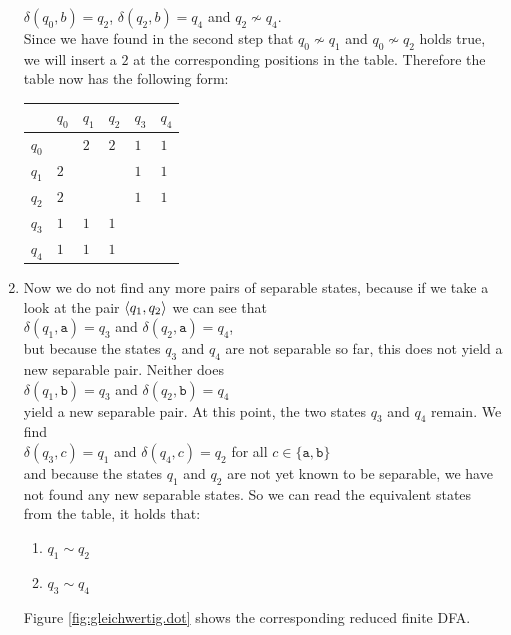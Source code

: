 \begin{enumerate}
      $\delta(q_0,b) = q_2$, \quad $\delta(q_2,b) = q_4$ \quad and \quad $q_2 \not\sim q_4$.
      \\[0.2cm]
      Since we have found in the second step that $q_0 \not\sim q_1$ and $q_0 \not\sim q_2$ holds true, we will insert a $2$ at the corresponding positions in the table. Therefore the table now has the following form:
      \begin{center}        
      \begin{tabular}[t]{|l||l|l|l|l|l|}
      \hline
        & $q_0$      &      $q_1$ &      $q_2$ &      $q_3$ &      $q_4$  \\
      \hline
      \hline
      $q_0$ &          &$2$ &$2$ &$1$ &$1$  \\
      \hline
      $q_1$ &$2$ &          &          &$1$ &$1$  \\
      \hline
      $q_2$ &$2$ &          &          &$1$ &$1$  \\
      \hline
      $q_3$ &$1$ &$1$ &$1$ &          &           \\
      \hline
      $q_4$ &$1$ &$1$ &$1$ &          &           \\
      \hline
      \end{tabular}
      \end{center}
\item Now we do not find any more pairs of separable states, because if we take a look at the pair $\pair(q_1,q_2)$ we can see that
      \\[0.2cm]
      \hspace*{1.3cm}
      $\delta(q_1,\texttt{a}) = q_3$ \quad and \quad $\delta(q_2,\texttt{a}) = q_4$, 
      \\[0.2cm]
      but because the states $q_3$ and $q_4$ are not separable so far, this does not yield a new
      separable pair.  Neither does 
      \\[0.2cm]
      \hspace*{1.3cm}
      $\delta(q_1,\texttt{b}) = q_3$ \quad and \quad $\delta(q_2,\texttt{b}) = q_4$
      \\[0.2cm]
      yield a new separable pair.  At this point, the two states $q_3$ and $q_4$ remain.  We find
      \\[0.2cm]
      \hspace*{1.3cm}
      $\delta(q_3,c) = q_1$ \quad and \quad $\delta(q_4,c) = q_2$ \quad for all $c \in \{\texttt{a}, \texttt{b}\}$
      \\[0.2cm]
      and because the states $q_1$ and $q_2$ are not yet known to be separable, we have not found any new separable states.
      So we can read the equivalent states from the table, it holds that:
      \begin{enumerate}
      \item $q_1 \sim q_2$
      \item $q_3 \sim q_4$
      \end{enumerate}
      Figure \ref{fig:gleichwertig.dot} shows the corresponding reduced finite \textsc{DFA}.
\end{enumerate}


